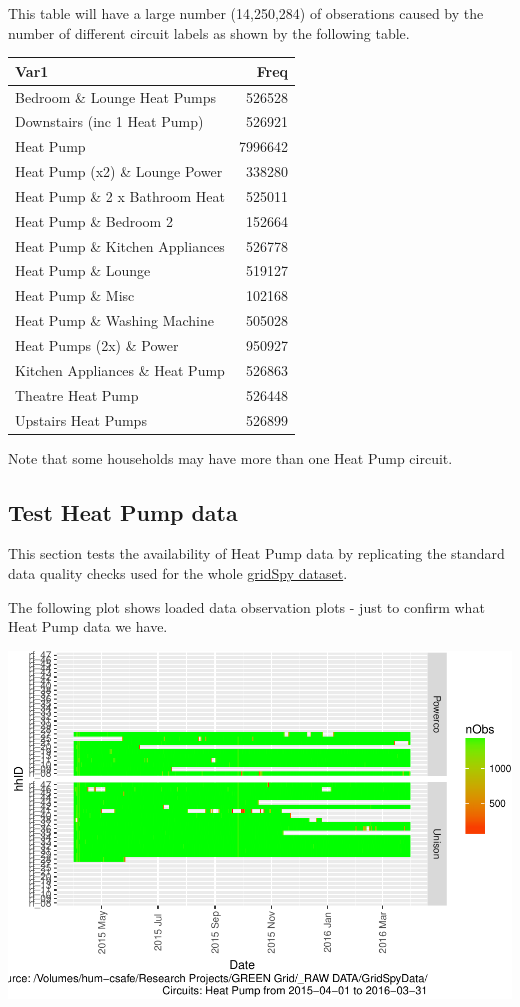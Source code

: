 \documentclass[]{article}
\begin{document}
This table will have a large number (14,250,284) of obserations caused
by the number of different circuit labels as shown by the following
table.

\begin{longtable}[]{@{}lr@{}}
\toprule
Var1 & Freq\tabularnewline
\midrule
\endhead
Bedroom \& Lounge Heat Pumps & 526528\tabularnewline
Downstairs (inc 1 Heat Pump) & 526921\tabularnewline
Heat Pump & 7996642\tabularnewline
Heat Pump (x2) \& Lounge Power & 338280\tabularnewline
Heat Pump \& 2 x Bathroom Heat & 525011\tabularnewline
Heat Pump \& Bedroom 2 & 152664\tabularnewline
Heat Pump \& Kitchen Appliances & 526778\tabularnewline
Heat Pump \& Lounge & 519127\tabularnewline
Heat Pump \& Misc & 102168\tabularnewline
Heat Pump \& Washing Machine & 505028\tabularnewline
Heat Pumps (2x) \& Power & 950927\tabularnewline
Kitchen Appliances \& Heat Pump & 526863\tabularnewline
Theatre Heat Pump & 526448\tabularnewline
Upstairs Heat Pumps & 526899\tabularnewline
\bottomrule
\end{longtable}

Note that some households may have more than one Heat Pump circuit.

\subsection{Test Heat Pump data}\label{test-heat-pump-data}

This section tests the availability of Heat Pump data by replicating the
standard data quality checks used for the whole
\href{https://git.soton.ac.uk/ba1e12/nzGREENGrid/tree/master/dataProcessing/gridSpy}{gridSpy
dataset}.

The following plot shows loaded data observation plots - just to confirm
what Heat Pump data we have.

\includegraphics{nzGGHouseholdPowerDemandProfile_Heat Pump_2015-04-01_2016-03-31_files/figure-latex/loadedFilesObs Tile Plot-1.pdf}
\end{document}
